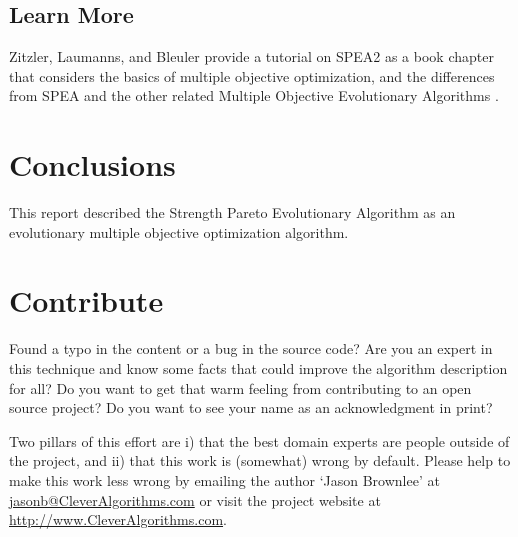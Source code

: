 \documentclass[a4paper, 11pt]{article}
\makeatletter
\newcommand{\myreportauthor}{Jason Brownlee}
\newcommand{\myreportemail}{jasonb@CleverAlgorithms.com}
\newcommand{\myreportwebsite}{http://www.CleverAlgorithms.com}
\makeatother
\begin{document}
% 
\subsection{Learn More}
Zitzler, Laumanns, and Bleuler provide a tutorial on SPEA2 as a book chapter that considers the basics of multiple objective optimization, and the differences from SPEA and the other related Multiple Objective Evolutionary Algorithms \cite{Zitzler2004}.

% 
% 
\section{Conclusions}
\label{sec:conclusions}
This report described the Strength Pareto Evolutionary Algorithm as an evolutionary multiple objective optimization algorithm.

% 
% 
\section{Contribute}
\label{sec:contribute}
Found a typo in the content or a bug in the source code? 
Are you an expert in this technique and know some facts that could improve the algorithm description for all?
Do you want to get that warm feeling from contributing to an open source project? 
Do you want to see your name as an acknowledgment in print?

Two pillars of this effort are i) that the best domain experts are people outside of the project, and ii) that this work is (somewhat) wrong by default. 
Please help to make this work less wrong by emailing the author `\myreportauthor' at \url{\myreportemail} or visit the project website at \url{\myreportwebsite}.



\end{document}
